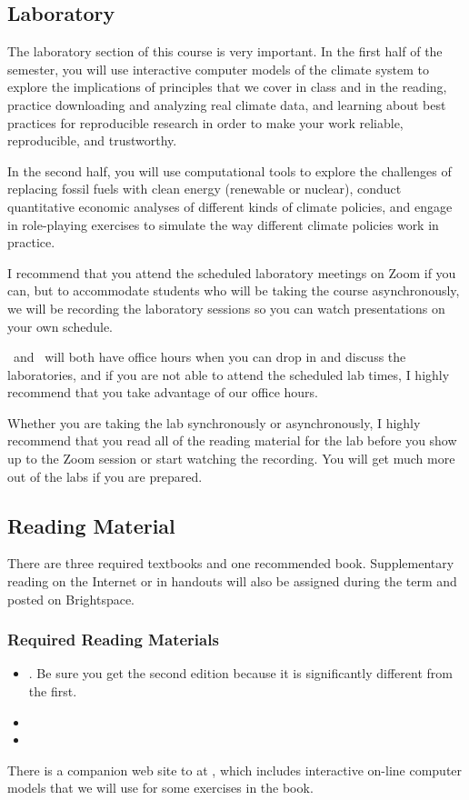 \documentclass[11pt,twoside]{jgsyllabus}\usepackage[]{graphicx}\usepackage[]{color}
\begin{document}
\subsection{Laboratory}
The laboratory section of this course is very important.
In the first half of the semester, you will use interactive computer models of
the climate system to explore the implications of principles that we cover in
class and in the reading, practice downloading and analyzing real climate data,
and learning about best practices for reproducible research in order to make
your work reliable, reproducible, and trustworthy.

In the second half, you will use computational tools to explore the challenges
of replacing fossil fuels with clean energy (renewable or nuclear), conduct
quantitative economic analyses of different kinds of climate policies, and
engage in role-playing exercises to simulate the way different climate policies
work in practice.

I recommend that you attend the scheduled laboratory meetings on Zoom if you
can, but to accommodate students who will be taking the course asynchronously,
we will be recording the laboratory sessions so you can watch presentations
on your own schedule.

\TaTitle\ and \ProfTitle\ will both have office hours
when you can drop in and discuss the laboratories, and if you are not able to
attend the scheduled lab times, I highly  recommend that you take advantage of
our office hours.

Whether you are taking the lab synchronously or asynchronously, I highly
recommend that you read all of the reading material for the lab before you
show up to the Zoom session or start watching the recording. You will get much
more out of the labs if you are prepared.

\subsection{Reading Material}
There are three required textbooks and one recommended book.
Supplementary reading on the Internet or in handouts will also be assigned
during the term and posted on Brightspace.

\subsubsection[Required Reading]{Required Reading Materials}
\begin{itemize}
	\item \LongArcher. Be sure you get the second edition because it is
	      significantly different from the first.
	\item \LongNordhaus
	\item \LongPielke
\end{itemize}
There is a companion web site to \emph{\Archer\/} at \ArcherURL, which includes
interactive on-line computer models that we will use for some exercises in the
book.
\end{document}
